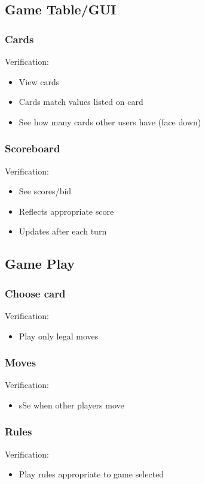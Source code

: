 \documentclass[11pt, titlepage]{article}
\begin{document}
		\subsection{Game Table/GUI}
			\subsubsection{Cards}
			Verification:
			\begin{itemize}
				\item View  cards
				\item Cards match values listed on card
				\item See how many cards other users have (face down) 
			\end{itemize}
			\subsubsection{Scoreboard}
			Verification:
			\begin{itemize}
				\item See scores/bid
				\item Reflects appropriate score
				\item Updates after each turn
			\end{itemize}
			
		\subsection{Game Play}
			\subsubsection{Choose card}
			Verification:
				\begin{itemize}	
					\item Play only legal moves
				\end{itemize}
			\subsubsection{Moves}
			Verification:
			\begin{itemize}
				\item 	sSe when other players move
			\end{itemize}
		
			\subsubsection{Rules}
			Verification:
			\begin{itemize}
				\item Play rules appropriate to game selected	
			\end{itemize}
		
\end{document}

